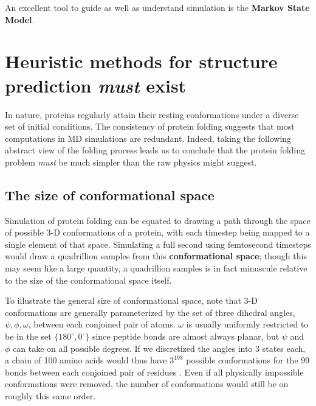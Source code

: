 \documentclass{article}
\begin{document}
An excellent tool to guide as well as understand simulation is the \textbf{Markov State Model}.  





\section{Heuristic methods for structure prediction \textit{must} exist}
In nature, proteins regularly attain their resting conformations under a diverse set of initial conditions. The consistency of protein folding suggests that most computations in MD simulations are redundant. Indeed, taking the following abstract view of the folding process leads us to conclude that the protein folding problem \textit{must} be much simpler than the raw physics might suggest.

\subsection{The size of conformational space}
Simulation of protein folding can be equated to drawing a path through the space of possible 3-D conformations of a protein, with each timestep being mapped to a single element of that space. Simulating a full second using femtosecond timesteps would draw a quadrillion samples from this \textbf{conformational space}; though this may seem like a large quantity, a quadrillion samples is in fact minuscule relative to the size of the conformational space itself.

To illustrate the general size of conformational space, note that 3-D conformations are generally parameterized by the set of three dihedral angles, $\psi, \phi, \omega$, between each conjoined pair of atoms. $\omega$ is usually uniformly restricted to be in the set $\{180^\circ, 0^\circ\}$ since peptide bonds are almost always planar, but $\psi$ and $\phi$ can take on all possible degrees. If we discretized the angles into 3 states each, a chain of 100 amino acids would thus have $3^198$ possible conformations for the 99 bonds between each conjoined pair of residues \cite{levinthal}. Even if all physically impossible conformations were removed, the number of conformations would still be on roughly this same order.
\end{document}
